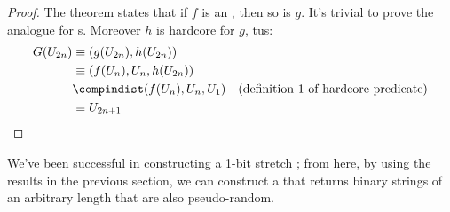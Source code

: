 \begin{proof}
    The theorem states that if $f$ is an \owf, then so is $g$. It's trivial to prove the analogue for \owp{}s. Moreover $h$ is hardcore for $g$, tus:
    \begin{align*}
        G(U_{2n}) &\equiv (g(U_{2n}), h(U_{2n})) & \\
        &\equiv (f(U_n), U_n, h(U_{2n})) & \\
        &\compindist (f(U_{n}), U_{n}, U_{1}) & \text{(definition 1 of hardcore predicate)} \\
        &\equiv U_{2n+1} &
    \end{align*}

\end{proof}

We've been successful in constructing a 1-bit stretch \prg; from here, by using the results in the previous section, we can construct a \prg{} that returns binary strings of an arbitrary length that are also pseudo-random.

